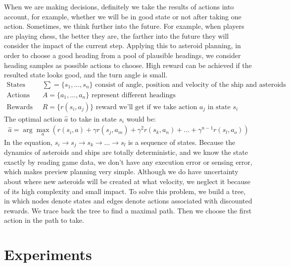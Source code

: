 \documentclass[10pt,final,conference]{article}
\begin{document}
When we are making decisions, definitely we take the results of actions into account, for example, whether we will be in good state or not after taking one action. Sometimes, we think further into the future. For example, when players are playing chess, the better they are, the farther into the future they will consider the impact of the current step. Applying this to asteroid planning, in order to choose a good heading from a pool of plausible headings, we consider heading samples as possible actions to choose. High reward can be achieved if the resulted state looks good, and the turn angle is small. 
\begin{equation} \nonumber
\begin{split}
\text{States\ \ \ \ }\ &\sum = \{s_1,..., s_n\}  \text{\ \ \ \ consist of angle, position and velocity of the ship and asteroids} \\
\text{Actions\ \ \ \ }\; &A = \{a_1,..., a_n\} \text{\ \ \ \ \ \ represent different headings} \\
\text{Rewards\ \ \ \ }\; &R = \{r(s_i, a_j)\} \text{\ \ \ \ \ \ \ reward we'll get if we take action $a_j$ in state $s_i$}
\end{split}
\end{equation}
The optimal action $\hat{a}$ to take in state $s_i$ would be:
\begin{equation} \nonumber
\begin{split}
\hat{a} = \arg\max_{a} \left ( r(s_i, a) + \gamma r(s_j, a_m) + \gamma^2 r(s_k, a_n) + ... + \gamma^{n-1} r(s_l, a_o) \right ) 
\end{split}
\end{equation}
In the equation, $s_i \rightarrow s_j \rightarrow s_k \rightarrow ... \rightarrow  s_l$ is a sequence of states.
Because the dynamics of asteroids and ships are totally deterministic, and we know the state exactly by reading game data, we don't have any execution error or sensing error, which makes preview planning very simple. Although we do have uncertainty about where new asteroids will be created at what velocity, we neglect it because of its high complexity and small impact. To solve this problem, we build a tree, in which nodes denote states and edges denote actions associated with discounted rewards. We trace back the tree to find a maximal path. Then we choose the first action in the path to take. 

\section{Experiments}
\end{document}
